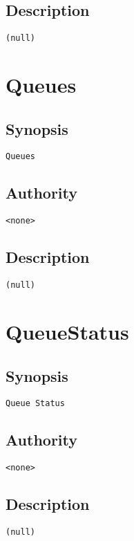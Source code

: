 \subsection{Description}
\begin{verbatim}
(null)
\end{verbatim}


\section{Queues}
\subsection{Synopsis}
\begin{verbatim}
Queues
\end{verbatim}
\subsection{Authority}
\begin{verbatim}
<none>
\end{verbatim}
\subsection{Description}
\begin{verbatim}
(null)
\end{verbatim}


\section{QueueStatus}
\subsection{Synopsis}
\begin{verbatim}
Queue Status
\end{verbatim}
\subsection{Authority}
\begin{verbatim}
<none>
\end{verbatim}
\subsection{Description}
\begin{verbatim}
(null)
\end{verbatim}



